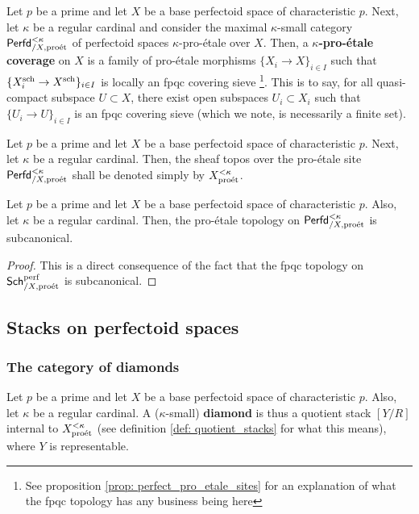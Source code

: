                 \begin{definition} \label{def: pro_etale_topology_on_perfectoid_spaces}
                    Let $p$ be a prime and let $X$ be a base perfectoid space of characteristic $p$. Next, let $\kappa$ be a regular cardinal and consider the maximal $\kappa$-small category $\mathsf{Perfd}_{/X, \mathrm{pro\acute{e}t}}^{< \kappa}$ of perfectoid spaces $\kappa$-pro-\'etale over $X$. Then, a \textbf{$\kappa$-pro-\'etale coverage} on $X$ is a family of pro-\'etale morphisms $\{X_i \to X\}_{i \in I}$ such that $\{X_i^{\mathrm{sch}} \to X^{\mathrm{sch}}\}_{i \in I}$ is locally an fpqc covering sieve \footnote{See proposition \ref{prop: perfect_pro_etale_sites} for an explanation of what the fpqc topology has any business being here}. This is to say, for all quasi-compact subspace $U \subset X$, there exist open subspaces $U_i \subset X_i$ such that $\{U_i \to U\}_{i \in I}$ is an fpqc covering sieve (which we note, is necessarily a finite set).
                \end{definition}
                \begin{convention}
                    Let $p$ be a prime and let $X$ be a base perfectoid space of characteristic $p$. Next, let $\kappa$ be a regular cardinal. Then, the sheaf topos over the pro-\'etale site $\mathsf{Perfd}_{/X, \mathrm{pro\acute{e}t}}^{< \kappa}$ shall be denoted simply by $X_{\mathrm{pro\acute{e}t}}^{< \kappa}$.
                \end{convention}
                
                \begin{proposition}
                    Let $p$ be a prime and let $X$ be a base perfectoid space of characteristic $p$. Also, let $\kappa$ be a regular cardinal. Then, the pro-\'etale topology on $\mathsf{Perfd}_{/X, \mathrm{pro\acute{e}t}}^{< \kappa}$ is subcanonical.
                \end{proposition}
                    \begin{proof}
                        This is a direct consequence of the fact that the fpqc topology on $\mathsf{Sch}^{\mathrm{perf}}_{/X, \mathrm{pro\acute{e}t}}$ is subcanonical.
                    \end{proof}
            
        \subsection{Stacks on perfectoid spaces}        
            \subsubsection{The category of diamonds}
                \begin{definition}[Diamonds] \label{def: diamonds}
                    Let $p$ be a prime and let $X$ be a base perfectoid space of characteristic $p$. Also, let $\kappa$ be a regular cardinal. A ($\kappa$-small) \textbf{diamond} is thus a quotient stack $[Y/R]$ internal to $X_{\mathrm{pro\acute{e}t}}^{< \kappa}$ (see definition \ref{def: quotient_stacks} for what this means), where $Y$ is representable.
                \end{definition}
                
